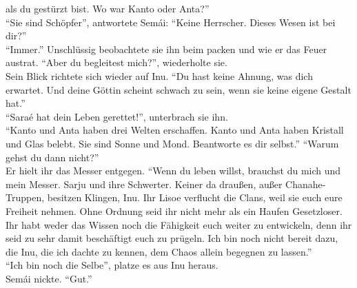 als du gestürzt bist. Wo war Kanto oder Anta?''\\
``Sie sind Schöpfer'', antwortete Semái: ``Keine Herrscher. Dieses Wesen ist bei dir?''\\
``Immer.''
Unschlüssig beobachtete sie ihn beim packen und wie er das Feuer austrat. ``Aber du begleitest 
mich?'', wiederholte sie.\\
Sein Blick richtete sich wieder auf Inu. ``Du hast keine 
Ahnung, was dich erwartet. Und deine Göttin scheint schwach zu sein, wenn sie keine eigene Gestalt 
hat.''\\
``Saraé hat dein Leben gerettet!'', unterbrach sie ihn.\\
``Kanto und Anta haben drei Welten erschaffen. Kanto und Anta haben Kristall und Glas belebt. Sie 
sind Sonne und Mond. Beantworte es dir selbst.''
``Warum gehst du dann nicht?''\\
Er hielt ihr das Messer entgegen. ``Wenn du leben willst, brauchst du mich und mein Messer. Sarju 
und ihre Schwerter. Keiner da draußen, außer Chanahe-Truppen, besitzen Klingen, Inu. Ihr Lisoe 
verflucht die Clans, weil sie euch eure Freiheit nehmen. Ohne Ordnung seid ihr nicht mehr als ein 
Haufen Gesetzloser. Ihr habt weder das Wissen noch die Fähigkeit euch weiter zu entwickeln, denn ihr 
seid zu sehr damit beschäftigt euch zu prügeln. Ich bin noch nicht bereit dazu, die Inu, die ich 
dachte zu kennen, dem Chaos allein begegnen zu lassen.''\\
``Ich bin noch die Selbe'', platze es aus Inu heraus.\\
Semái nickte. ``Gut.''

